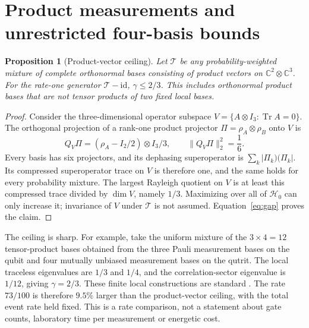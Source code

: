 \documentclass[11pt,a4paper]{article}
\newtheorem{proposition}[theorem]{Proposition}
\theoremstyle{remark}
\DeclareMathOperator{\Tr}{Tr}
\newcommand{\id}{\mathrm{id}}
\newcommand{\C}{\mathbb C}
\newcommand{\T}{\mathcal T}
\newcommand{\HH}{\mathcal H_0}
\begin{document}
\section{Product measurements and unrestricted four-basis bounds}
\begin{proposition}[Product-vector ceiling]\label{prop:product}
Let $\T$ be any probability-weighted mixture of complete orthonormal bases consisting of product vectors on $\C^2\otimes\C^3$. For the rate-one generator $\T-\id$, $\gamma\le2/3$. This includes orthonormal product bases that are not tensor products of two fixed local bases.
\end{proposition}
\begin{proof}
Consider the three-dimensional operator subspace
$V=\{A\otimes I_3:\Tr A=0\}$. The orthogonal projection of a rank-one product projector $\Pi=\rho_A\otimes\rho_B$ onto $V$ is
\[
 Q_V\Pi=(\rho_A-I_2/2)\otimes I_3/3,
 \qquad \|Q_V\Pi\|_2^2=\frac16.
\]
Every basis has six projectors, and its dephasing superoperator is $\sum_k|\Pi_k)(\Pi_k|$. Its compressed superoperator trace on $V$ is therefore one, and the same holds for every probability mixture. The largest Rayleigh quotient on $V$ is at least this compressed trace divided by $\dim V$, namely $1/3$. Maximizing over all of $\HH$ can only increase it; invariance of $V$ under $\T$ is not assumed. Equation~\eqref{eq:gap} proves the claim.
\end{proof}
The ceiling is sharp. For example, take the uniform mixture of the $3\times4=12$ tensor-product bases obtained from the three Pauli measurement bases on the qubit and four mutually unbiased measurement bases on the qutrit. The local traceless eigenvalues are $1/3$ and $1/4$, and the correlation-sector eigenvalue is $1/12$, giving $\gamma=2/3$. These finite local constructions are standard \cite{wootters}. The rate $73/100$ is therefore $9.5\%$ larger than the product-vector ceiling, with the total event rate held fixed. This is a rate comparison, not a statement about gate counts, laboratory time per measurement or energetic cost.
\end{document}
